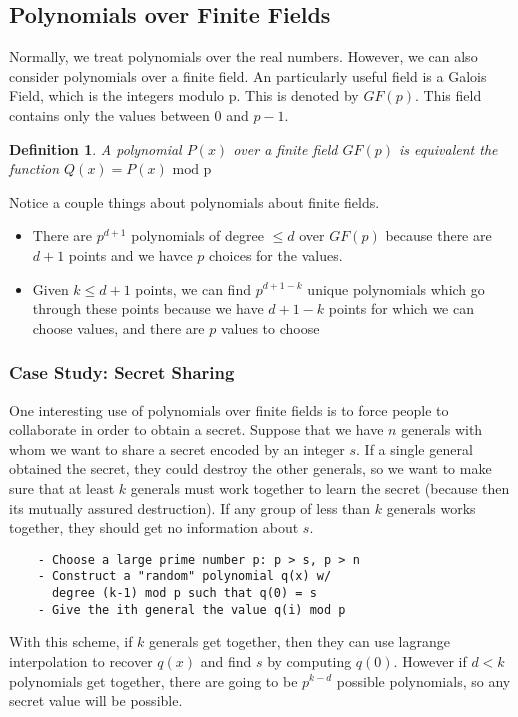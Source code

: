 \documentclass{article}
\newtheorem{definition}{Definition}
\begin{document}
\subsection{Polynomials over Finite Fields}
Normally, we treat polynomials over the real numbers. However, we can also consider polynomials over a finite field.
An particularly useful field is a Galois Field, which is the integers modulo p. This is denoted by $GF(p)$.
This field contains only the values between $0$ and $p-1$. 
\begin{definition}
    A polynomial $P(x)$ over a finite field $GF(p)$ is equivalent
    the function $Q(x) = P(x) \text{ mod p}$
\end{definition}
Notice a couple things about polynomials about finite fields.
\begin{itemize}
    \item There are $p^{d+1}$ polynomials of degree $\le d$ over $GF(p)$ because there are $d+1$ points and we havce $p$ choices for the values.
    \item Given $k \le d+1$ points, we can find $p^{d+1-k}$ unique polynomials which go through these points because we have $d+1-k$ points for which we can choose values, and there are $p$ values to choose 
\end{itemize}
\subsubsection{Case Study: Secret Sharing}
One interesting use of polynomials over finite fields is to force people to collaborate in order to obtain a secret.
Suppose that we have $n$ generals with whom we want to share a secret encoded by an integer $s$. If a single general obtained
the secret, they could destroy the other generals, so we want to make sure that at least $k$ generals must work together to learn the secret (because then its mutually assured destruction).
If any group of less than $k$ generals works together, they should get no information about $s$.
\begin{lstlisting}
    - Choose a large prime number p: p > s, p > n
    - Construct a "random" polynomial q(x) w/ 
      degree (k-1) mod p such that q(0) = s
    - Give the ith general the value q(i) mod p
\end{lstlisting}
With this scheme, if $k$ generals get together, then they can use lagrange interpolation to recover $q(x)$
and find $s$ by computing $q(0)$. However if $d < k$ polynomials get together, there are going to be $p^{k-d}$
possible polynomials, so any secret value will be possible.
\end{document}
